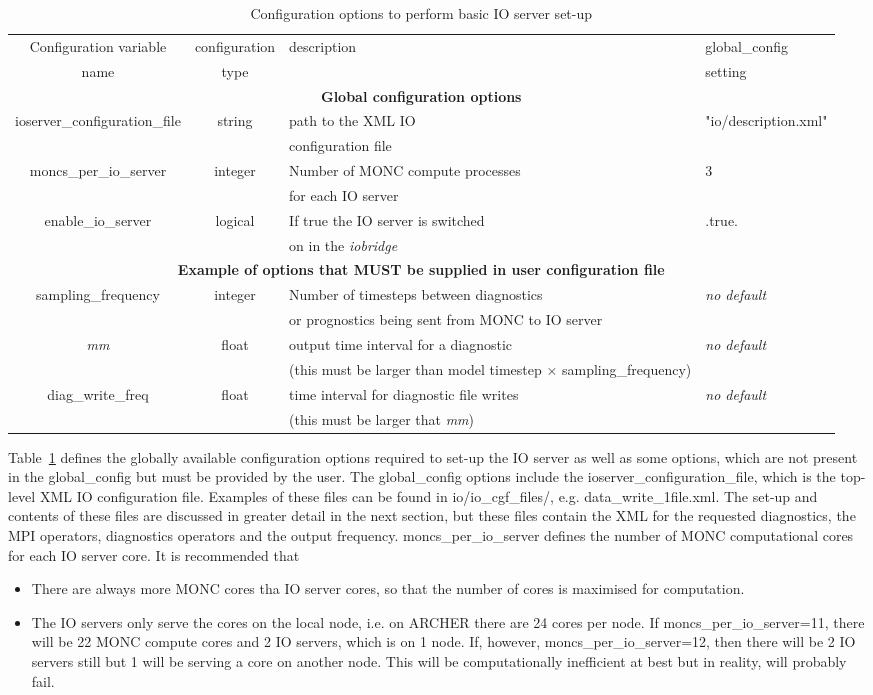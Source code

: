 \documentclass[a4paper,11pt]{article}
\begin{document}
\begin{table}[H]
  \protect\caption{Configuration options to perform basic IO server set-up}
\label{tab:monc_io_config}
\begin{tabular}{|c|c|p{5cm}|p{3cm}|}
\hline
Configuration variable & configuration & description & global\_config \tabularnewline
name & type & & setting \tabularnewline
\hline
\multicolumn{4}{|c|}{\bf{Global configuration options}} \tabularnewline
\hline
   ioserver\_configuration\_file & string & path to the XML IO  & "io/description.xml" \tabularnewline
   &  & configuration file &  \tabularnewline
\hline
   moncs\_per\_io\_server & integer & Number of MONC compute processes & 3 \tabularnewline
    &   & for each IO server &  \tabularnewline
\hline
    enable\_io\_server & logical & If true the IO server is switched  & .true. \tabularnewline
   &  & on in the \emph{iobridge} & \tabularnewline
\hline
\multicolumn{4}{|c|}{\bf{Example of options that MUST be supplied in user configuration file}} \tabularnewline
\hline
  sampling\_frequency & integer & Number of timesteps between diagnostics & \emph{no default} \tabularnewline
    &  & or prognostics being sent from MONC to IO server & \tabularnewline
\hline
   \emph{mm} & float & output time interval for a diagnostic & \emph{no default} \tabularnewline
    &  & (this must be larger than model timestep $\times$ sampling\_frequency) & \tabularnewline
\hline
   diag\_write\_freq & float & time interval for diagnostic file writes & \emph{no default} \tabularnewline
 &  & (this must be larger that \emph{mm})  & \tabularnewline
\hline
\hline
\end{tabular}
\end{table}

Table~\ref{tab:monc_io_config} defines the globally available configuration options
required to set-up the IO server as well as some options, which are not present in the
global\_config but must be provided by the user. The global\_config options
include the ioserver\_configuration\_file, which is the top-level XML IO configuration
file. Examples of these files can be found in io/io\_cgf\_files/, e.g.
data\_write\_1file.xml. The set-up and contents of these files are discussed
in greater detail in the next section, but these files contain the XML for the requested
diagnostics, the MPI operators, diagnostics operators and the output frequency.
moncs\_per\_io\_server defines the number of MONC computational cores for
each IO server core. It is recommended that

\begin{itemize}
   \item {There are always more MONC cores tha IO server cores, so that the number
   of cores is maximised for computation.}
   \item {The IO servers only serve the cores on the local node, i.e. on ARCHER
   there are 24 cores per node. If moncs\_per\_io\_server=11, there will be
   22 MONC compute cores and 2 IO servers, which is on 1 node. If, however,
   moncs\_per\_io\_server=12, then there will be 2 IO servers still but 1
   will be serving a core on another node. This will be computationally inefficient
   at best but in reality, will probably fail.}
\end{itemize}
\end{document}
